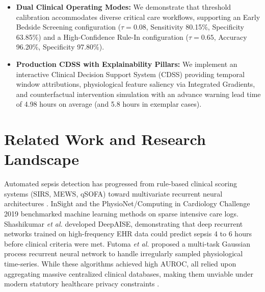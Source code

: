 \documentclass[10pt,a4paper,twocolumn,twoside]{article}
\begin{document}
\begin{itemize}
\item \textbf{Dual Clinical Operating Modes:} We demonstrate that threshold calibration accommodates diverse critical care workflows, supporting an Early Bedside Screening configuration ($\tau=0.08$, Sensitivity 80.15\%, Specificity 63.85\%) and a High-Confidence Rule-In configuration ($\tau=0.65$, Accuracy 96.20\%, Specificity 97.80\%).
    \item \textbf{Production CDSS with Explainability Pillars:} We implement an interactive Clinical Decision Support System (CDSS) providing temporal window attributions, physiological feature saliency via Integrated Gradients, and counterfactual intervention simulation with an advance warning lead time of 4.98 hours on average (and 5.8 hours in exemplar cases).
\end{itemize}

\section{Related Work and Research Landscape}
Automated sepsis detection has progressed from rule-based clinical scoring systems (SIRS, MEWS, qSOFA) toward multivariate recurrent neural architectures \cite{singer2016sepsis3,desautels2016prediction}. InSight \cite{desautels2016prediction} and the PhysioNet/Computing in Cardiology Challenge 2019 \cite{reyna2020physionet} benchmarked machine learning methods on sparse intensive care logs. Shashikumar \textit{et al.} \cite{shashikumar2021deepai} developed DeepAISE, demonstrating that deep recurrent networks trained on high-frequency EHR data could predict sepsis 4 to 6 hours before clinical criteria were met. Futoma \textit{et al.} \cite{futoma2017learning} proposed a multi-task Gaussian process recurrent neural network to handle irregularly sampled physiological time-series. While these algorithms achieved high AUROC, all relied upon aggregating massive centralized clinical databases, making them unviable under modern statutory healthcare privacy constraints \cite{kaissis2020trustworthy}.
\end{document}
